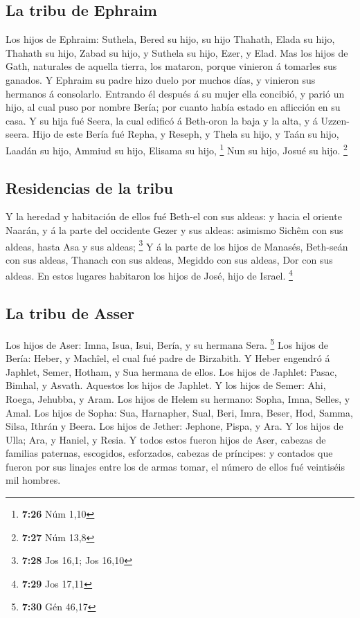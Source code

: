 \hypertarget{la-tribu-de-ephraim}{%
\subsection{La tribu de Ephraim}\label{la-tribu-de-ephraim}}

 Los hijos de Ephraim: Suthela, Bered su hijo, su hijo
Thahath, Elada su hijo, Thahath su hijo,  Zabad su hijo, y
Suthela su hijo, Ezer, y Elad. Mas los hijos de Gath, naturales de
aquella tierra, los mataron, porque vinieron á tomarles sus ganados.
 Y Ephraim su padre hizo duelo por muchos días, y vinieron
sus hermanos á consolarlo.  Entrando él después á su mujer
ella concibió, y parió un hijo, al cual puso por nombre Bería; por
cuanto había estado en aflicción en su casa.  Y su hija fué
Seera, la cual edificó á Beth-oron la baja y la alta, y á Uzzen-seera.
 Hijo de este Bería fué Repha, y Reseph, y Thela su hijo, y
Taán su hijo,  Laadán su hijo, Ammiud su hijo, Elisama su
hijo, \footnote{\textbf{7:26} Núm 1,10}  Nun su hijo, Josué
su hijo. \footnote{\textbf{7:27} Núm 13,8}

\hypertarget{residencias-de-la-tribu}{%
\subsection{Residencias de la tribu}\label{residencias-de-la-tribu}}

 Y la heredad y habitación de ellos fué Beth-el con sus
aldeas: y hacia el oriente Naarán, y á la parte del occidente Gezer y
sus aldeas: asimismo Sichêm con sus aldeas, hasta Asa y sus aldeas;
\footnote{\textbf{7:28} Jos 16,1; Jos 16,10}  Y á la parte
de los hijos de Manasés, Beth-seán con sus aldeas, Thanach con sus
aldeas, Megiddo con sus aldeas, Dor con sus aldeas. En estos lugares
habitaron los hijos de José, hijo de Israel. \footnote{\textbf{7:29} Jos
  17,11}

\hypertarget{la-tribu-de-asser}{%
\subsection{La tribu de Asser}\label{la-tribu-de-asser}}

 Los hijos de Aser: Imna, Isua, Isui, Bería, y su hermana
Sera. \footnote{\textbf{7:30} Gén 46,17}  Los hijos de
Bería: Heber, y Machîel, el cual fué padre de Birzabith.  Y
Heber engendró á Japhlet, Semer, Hotham, y Sua hermana de ellos.
 Los hijos de Japhlet: Pasac, Bimhal, y Asvath. Aquestos
los hijos de Japhlet.  Y los hijos de Semer: Ahi, Roega,
Jehubba, y Aram.  Los hijos de Helem su hermano: Sopha,
Imna, Selles, y Amal.  Los hijos de Sopha: Sua, Harnapher,
Sual, Beri, Imra,  Beser, Hod, Samma, Silsa, Ithrán y
Beera.  Los hijos de Jether: Jephone, Pispa, y Ara.
 Y los hijos de Ulla; Ara, y Haniel, y Resia. 
Y todos estos fueron hijos de Aser, cabezas de familias paternas,
escogidos, esforzados, cabezas de príncipes: y contados que fueron por
sus linajes entre los de armas tomar, el número de ellos fué veintiséis
mil hombres.

